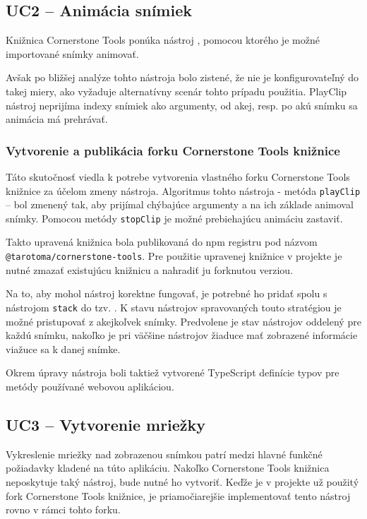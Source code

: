 \subsection {UC2 -- Animácia snímiek}
Knižnica Cornerstone Tools ponúka nástroj , pomocou ktorého je možné importované snímky animovať.

Avšak po bližšej analýze tohto nástroja bolo zistené, že nie je konfigurovateľný do takej miery, ako vyžaduje alternatívny scenár tohto prípadu použitia. PlayClip nástroj neprijíma indexy snímiek ako argumenty, od akej, resp. po akú snímku sa animácia má prehrávať.

\subsubsection {Vytvorenie a publikácia forku Cornerstone Tools knižnice}
Táto skutočnosť viedla k potrebe vytvorenia vlastného forku Cornerstone Tools knižnice za účelom zmeny  nástroja. Algoritmus tohto nástroja - metóda \texttt{playClip} -- bol zmenený tak, aby prijímal chýbajúce argumenty a na ich základe animoval snímky. Pomocou metódy \texttt{stopClip} je možné prebiehajúcu animáciu zastaviť.

Takto upravená knižnica bola publikovaná do npm registru pod názvom \texttt{@tarotoma/cornerstone-tools}. Pre použitie upravenej knižnice v projekte je nutné zmazať existujúcu knižnicu a nahradiť ju forknutou verziou. 

Na to, aby mohol  nástroj korektne fungovať, je potrebné ho pridať spolu s nástrojom \texttt{stack} do tzv. . K stavu nástrojov spravovaných touto stratégiou je možné pristupovať z akejkoľvek snímky. Predvolene je stav nástrojov oddelený pre každú snímku, nakoľko je pri väčšine nástrojov žiaduce mať zobrazené informácie viažuce sa k danej snímke.

Okrem úpravy  nástroja boli taktiež vytvorené TypeScript definície typov pre metódy používané webovou aplikáciou.

\subsection {UC3 -- Vytvorenie mriežky}
Vykreslenie mriežky nad zobrazenou snímkou patrí medzi hlavné funkčné požiadavky kladené na túto aplikáciu. Nakoľko Cornerstone Tools knižnica neposkytuje taký nástroj, bude nutné ho vytvoriť. Keďže je v projekte už použitý fork Cornerstone Tools knižnice, je priamočiarejšie implementovať tento nástroj rovno v rámci tohto forku.

